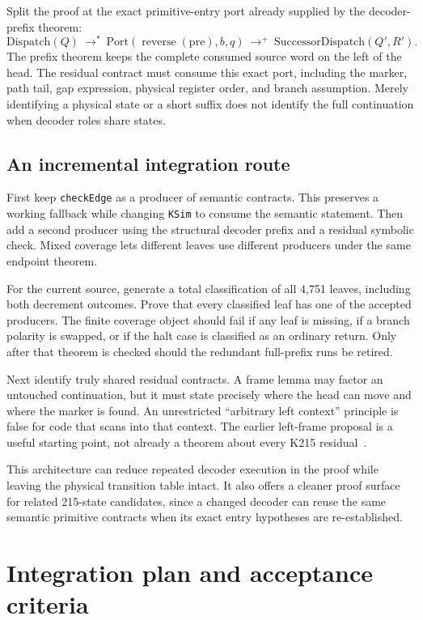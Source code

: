 \documentclass[11pt]{article}
\theoremstyle{remark}\newtheorem{remark}[theorem]{Remark}
\newcommand{\code}[1]{\texttt{\small #1}}
\begin{document}
Split the proof at the exact primitive-entry port already supplied by the decoder-prefix theorem:
\[
 \mathrm{Dispatch}(Q)
 \ \longrightarrow^*\ 
 \mathrm{Port}(\operatorname{reverse}(\mathrm{pre}),b,q)
 \ \longrightarrow^+\ 
 \mathrm{SuccessorDispatch}(Q',R').
\]
The prefix theorem keeps the complete consumed source word on the left of the head. The residual contract must consume this exact port, including the marker, path tail, gap expression, physical register order, and branch assumption. Merely identifying a physical state or a short suffix does not identify the full continuation when decoder roles share states.

\subsection{An incremental integration route}
First keep \code{checkEdge} as a producer of semantic contracts. This preserves a working fallback while changing \code{KSim} to consume the semantic statement. Then add a second producer using the structural decoder prefix and a residual symbolic check. Mixed coverage lets different leaves use different producers under the same endpoint theorem.

For the current source, generate a total classification of all 4,751 leaves, including both decrement outcomes. Prove that every classified leaf has one of the accepted producers. The finite coverage object should fail if any leaf is missing, if a branch polarity is swapped, or if the halt case is classified as an ordinary return. Only after that theorem is checked should the redundant full-prefix runs be retired.

Next identify truly shared residual contracts. A frame lemma may factor an untouched continuation, but it must state precisely where the head can move and where the marker is found. An unrestricted ``arbitrary left context'' principle is false for code that scans into that context. The earlier left-frame proposal is a useful starting point, not already a theorem about every K215 residual~\cite{leftframe}.

This architecture can reduce repeated decoder execution in the proof while leaving the physical transition table intact. It also offers a cleaner proof surface for related 215-state candidates, since a changed decoder can reuse the same semantic primitive contracts when its exact entry hypotheses are re-established.

\section{Integration plan and acceptance criteria}
\end{document}
